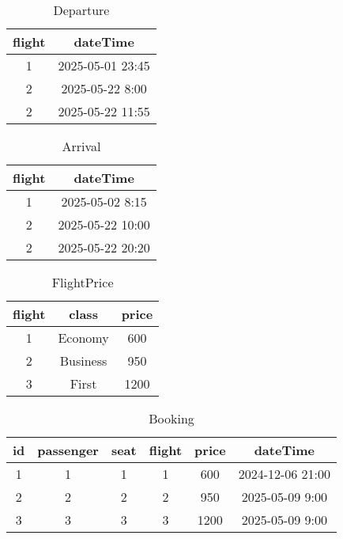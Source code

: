 \begin{table}[h!] 
\centering          
\begin{tabular}{|c|c|} 
\hline             
flight & dateTime \\ 
\hline
1 & 2025-05-01 23:45 \\ 
\hline
2 & 2025-05-22 8:00 \\ 
\hline
2 & 2025-05-22 11:55 \\ 
\hline
\end{tabular}
\caption{Departure} 
\label{tab:example} 
\end{table}

\begin{table}[h!] 
\centering          
\begin{tabular}{|c|c|} 
\hline             
flight & dateTime \\ 
\hline
1 & 2025-05-02 8:15 \\ 
\hline
2 & 2025-05-22 10:00 \\ 
\hline
2 & 2025-05-22 20:20 \\ 
\hline
\end{tabular}
\caption{Arrival} 
\label{tab:example} 
\end{table}

\begin{table}[h!]
\centering         
\begin{tabular}{|c|c|c|} 
\hline             
flight & class & price \\ 
\hline
1 & Economy & 600 \\ 
\hline
2 & Business & 950 \\
\hline
3 & First & 1200 \\ 
\hline
\end{tabular}
\caption{FlightPrice} 
\label{tab:example} 
\end{table}

\begin{table}[h!]
\centering         
\begin{tabular}{|c|c|c|c|c|c|} 
\hline             
id & passenger & seat & flight & price & dateTime \\ 
\hline
1 & 1 & 1 & 1 & 600 & 2024-12-06 21:00\\ 
\hline
2 & 2 & 2 & 2 & 950 & 2025-05-09 9:00\\
\hline
3 & 3 & 3 & 3 & 1200 & 2025-05-09 9:00\\ 
\hline
\end{tabular}
\caption{Booking} 
\label{tab:example} 
\end{table}
